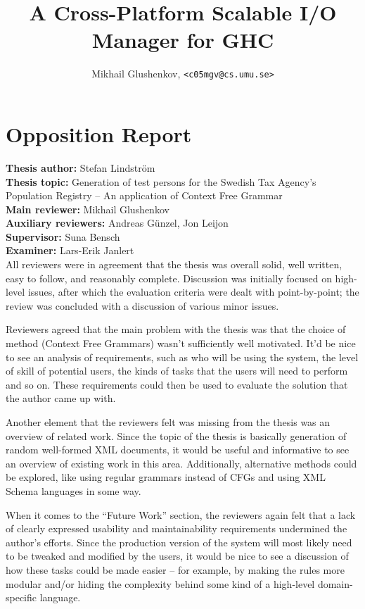 \documentclass[10pt, oneside]{article}
\author{Mikhail Glushenkov, \texttt{<c05mgv@cs.umu.se>}}
\title{A Cross-Platform Scalable I/O Manager for GHC}
\begin{document}
\pagestyle{empty}

\section*{Opposition Report}

\textbf{Thesis author:} Stefan Lindström\\
\textbf{Thesis topic:} Generation of test persons for the Swedish Tax Agency's
Population Registry -- An application of Context Free Grammar\\
\textbf{Main reviewer:} Mikhail Glushenkov\\
\textbf{Auxiliary reviewers:} Andreas Günzel, Jon Leijon\\
\textbf{Supervisor:} Suna Bensch\\
\textbf{Examiner:} Lars-Erik Janlert\\

All reviewers were in agreement that the thesis was overall solid, well written,
easy to follow, and reasonably complete. Discussion was initially focused on
high-level issues, after which the evaluation criteria were dealt with
point-by-point; the review was concluded with a discussion of various minor
issues.

Reviewers agreed that the main problem with the thesis was that the choice of
method (Context Free Grammars) wasn't sufficiently well motivated. It'd be nice
to see an analysis of requirements, such as who will be using the system, the
level of skill of potential users, the kinds of tasks that the users will need
to perform and so on. These requirements could then be used to evaluate the
solution that the author came up with.

Another element that the reviewers felt was missing from the thesis was an
overview of related work. Since the topic of the thesis is basically generation
of random well-formed XML documents, it would be useful and informative to see
an overview of existing work in this area. Additionally, alternative methods
could be explored, like using regular grammars instead of CFGs and using XML
Schema languages in some way.

When it comes to the ``Future Work'' section, the reviewers again felt that a
lack of clearly expressed usability and maintainability requirements undermined
the author's efforts. Since the production version of the system will most
likely need to be tweaked and modified by the users, it would be nice to see a
discussion of how these tasks could be made easier -- for example, by making the
rules more modular and/or hiding the complexity behind some kind of a high-level
domain-specific language.
\end{document}

